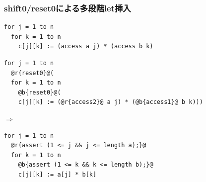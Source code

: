 \documentclass[dvipdfmx,cjk,xcolor=dvipsnames,envcountsect,notheorems,12pt,handout]{beamer} \usepackage{pgfpages} \pgfpagesuselayout{4 on 1}[a4paper,landscape,border shrink=5mm]
\theoremstyle{definition}
\begin{document}


\begin{frame}[fragile]
  \frametitle{shift0/reset0による多段階let挿入}



\begin{lstlisting}
for j = 1 to n
  for k = 1 to n
    c[j][k] := (access a j) * (access b k)
\end{lstlisting}
  \pause
\begin{lstlisting}
for j = 1 to n
  @r{reset0}@(
  for k = 1 to n
    @b{reset0}@(
    c[j][k] := (@r{access2}@ a j) * (@b{access1}@ b k)))
\end{lstlisting}

  \pause
  $\Rightarrow$

\begin{lstlisting}
for j = 1 to n
  @r{assert (1 <= j && j <= length a);}@
  for k = 1 to n
    @b{assert (1 <= k && k <= length b);}@
    c[j][k] := a[j] * b[k]
\end{lstlisting}
\end{frame}
\end{document}
